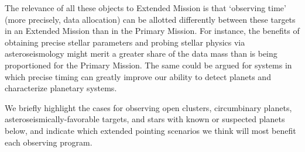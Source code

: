 The relevance of all these objects to \tesss Extended Mission is that `observing time' (more precisely, data allocation) can be allotted differently between these targets in an Extended Mission than in the Primary Mission.
For instance, the benefits of obtaining precise stellar parameters and probing stellar physics via asteroseismology might merit a greater share of the data mass than is being proportioned for the Primary Mission.
The same could be argued for systems in which precise timing can greatly improve our ability to detect planets and characterize planetary systems.

We briefly highlight the cases for observing open clusters, circumbinary planets, asteroseismically-favorable targets, and stars with known or suspected planets below, and indicate which extended pointing scenarios we think will most benefit each observing program.

